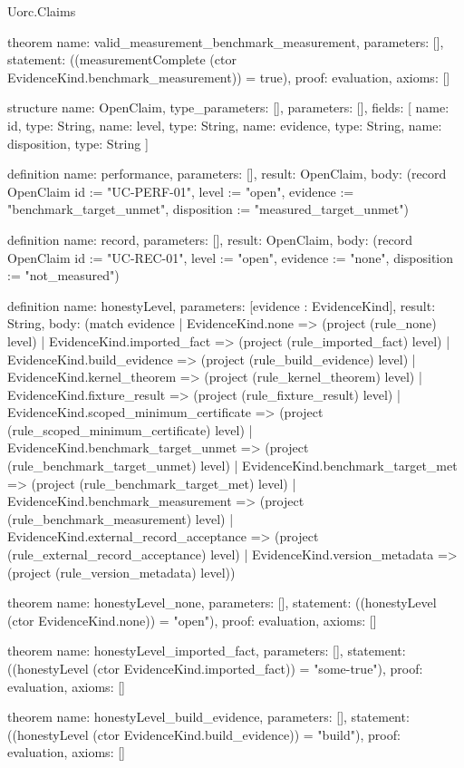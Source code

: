 \begin{lexlean}{Uorc.Claims}
\begin{semanticmodule}
theorem{
  name: valid_measurement_benchmark_measurement,
  parameters: [],
  statement: ((measurementComplete (ctor EvidenceKind.benchmark_measurement)) = true),
  proof: evaluation{},
  axioms: []
}

structure{
  name: OpenClaim,
  type_parameters: [],
  parameters: [],
  fields: [
    {name: id, type: String},
    {name: level, type: String},
    {name: evidence, type: String},
    {name: disposition, type: String}
  ]
}

definition{
  name: performance,
  parameters: [],
  result: OpenClaim,
  body: (record OpenClaim {id := "UC-PERF-01", level := "open", evidence := "benchmark_target_unmet", disposition := "measured_target_unmet"})
}

definition{
  name: record,
  parameters: [],
  result: OpenClaim,
  body: (record OpenClaim {id := "UC-REC-01", level := "open", evidence := "none", disposition := "not_measured"})
}

definition{
  name: honestyLevel,
  parameters: [evidence : EvidenceKind],
  result: String,
  body: (match evidence
    | EvidenceKind.none => (project (rule_none) level)
    | EvidenceKind.imported_fact => (project (rule_imported_fact) level)
    | EvidenceKind.build_evidence => (project (rule_build_evidence) level)
    | EvidenceKind.kernel_theorem => (project (rule_kernel_theorem) level)
    | EvidenceKind.fixture_result => (project (rule_fixture_result) level)
    | EvidenceKind.scoped_minimum_certificate => (project (rule_scoped_minimum_certificate) level)
    | EvidenceKind.benchmark_target_unmet => (project (rule_benchmark_target_unmet) level)
    | EvidenceKind.benchmark_target_met => (project (rule_benchmark_target_met) level)
    | EvidenceKind.benchmark_measurement => (project (rule_benchmark_measurement) level)
    | EvidenceKind.external_record_acceptance => (project (rule_external_record_acceptance) level)
    | EvidenceKind.version_metadata => (project (rule_version_metadata) level))
}

theorem{
  name: honestyLevel_none,
  parameters: [],
  statement: ((honestyLevel (ctor EvidenceKind.none)) = "open"),
  proof: evaluation{},
  axioms: []
}

theorem{
  name: honestyLevel_imported_fact,
  parameters: [],
  statement: ((honestyLevel (ctor EvidenceKind.imported_fact)) = "some-true"),
  proof: evaluation{},
  axioms: []
}

theorem{
  name: honestyLevel_build_evidence,
  parameters: [],
  statement: ((honestyLevel (ctor EvidenceKind.build_evidence)) = "build"),
  proof: evaluation{},
  axioms: []
}


\end{semanticmodule}
\end{lexlean}
